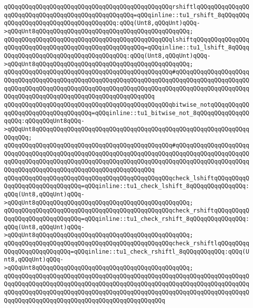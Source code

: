 \verb|qQQqqQQqqQQqqQQqqQQqqQQqqQQqqQQqqQQqqQQqqQQqqQQqrshiftlqQQqqQQqqQQqqQQqqQQqqQQqqQQqqQQqqQQqqQQqqQQqqQQqqQQq=qQQqinline::tu1_rshift_8qQQqqQQqqQQqqQQqqQQqqQQqqQQqqQQqqQQqqQQq:qQQq(Unt8,qQQqUnt)qQQq->qQQqUnt8qQQqqQQqqQQqqQQqqQQqqQQqqQQqqQQqqQQqqQQqqQQq;|\newline
\verb|qQQqqQQqqQQqqQQqqQQqqQQqqQQqqQQqqQQqqQQqqQQqqQQqlshiftqQQqqQQqqQQqqQQqqQQqqQQqqQQqqQQqqQQqqQQqqQQqqQQqqQQqqQQq=qQQqinline::tu1_lshift_8qQQqqQQqqQQqqQQqqQQqqQQqqQQqqQQqqQQqqQQq:qQQq(Unt8,qQQqUnt)qQQq->qQQqUnt8qQQqqQQqqQQqqQQqqQQqqQQqqQQqqQQqqQQqqQQqqQQq;|\newline
\verb|qQQqqQQqqQQqqQQqqQQqqQQqqQQqqQQqqQQqqQQqqQQqqQQq#qQQqqQQqqQQqqQQqqQQqqQQqqQQqqQQqqQQqqQQqqQQqqQQqqQQqqQQqqQQqqQQqqQQqqQQqqQQqqQQqqQQqqQQqqQQqqQQqqQQqqQQqqQQqqQQqqQQqqQQqqQQqqQQqqQQqqQQqqQQqqQQqqQQqqQQqqQQqqQQqqQQqqQQqqQQqqQQqqQQqqQQqqQQqqQQqqQQqqQQqqQQq|\newline
\verb|qQQqqQQqqQQqqQQqqQQqqQQqqQQqqQQqqQQqqQQqqQQqqQQqbitwise_notqQQqqQQqqQQqqQQqqQQqqQQqqQQqqQQqqQQq=qQQqinline::tu1_bitwise_not_8qQQqqQQqqQQqqQQqqQQq:qQQqqQQqUnt8qQQq->qQQqUnt8qQQqqQQqqQQqqQQqqQQqqQQqqQQqqQQqqQQqqQQqqQQqqQQqqQQqqQQqqQQqqQQqqQQq;|\newline
\verb|qQQqqQQqqQQqqQQqqQQqqQQqqQQqqQQqqQQqqQQqqQQqqQQq#qQQqqQQqqQQqqQQqqQQqqQQqqQQqqQQqqQQqqQQqqQQqqQQqqQQqqQQqqQQqqQQqqQQqqQQqqQQqqQQqqQQqqQQqqQQqqQQqqQQqqQQqqQQqqQQqqQQqqQQqqQQqqQQqqQQqqQQqqQQqqQQqqQQqqQQqqQQqqQQqqQQqqQQqqQQqqQQqqQQqqQQqqQQqqQQqqQQqqQQqqQQq|\newline
\verb|qQQqqQQqqQQqqQQqqQQqqQQqqQQqqQQqqQQqqQQqqQQqqQQqcheck_lshiftqQQqqQQqqQQqqQQqqQQqqQQqqQQqqQQq=qQQqinline::tu1_check_lshift_8qQQqqQQqqQQqqQQq:qQQq(Unt8,qQQqUnt)qQQq->qQQqUnt8qQQqqQQqqQQqqQQqqQQqqQQqqQQqqQQqqQQqqQQqqQQq;|\newline
\verb|qQQqqQQqqQQqqQQqqQQqqQQqqQQqqQQqqQQqqQQqqQQqqQQqcheck_rshiftqQQqqQQqqQQqqQQqqQQqqQQqqQQqqQQq=qQQqinline::tu1_check_rshift_8qQQqqQQqqQQqqQQq:qQQq(Unt8,qQQqUnt)qQQq->qQQqUnt8qQQqqQQqqQQqqQQqqQQqqQQqqQQqqQQqqQQqqQQqqQQq;|\newline
\verb|qQQqqQQqqQQqqQQqqQQqqQQqqQQqqQQqqQQqqQQqqQQqqQQqcheck_rshiftlqQQqqQQqqQQqqQQqqQQqqQQqqQQq=qQQqinline::tu1_check_rshiftl_8qQQqqQQqqQQq:qQQq(Unt8,qQQqUnt)qQQq->qQQqUnt8qQQqqQQqqQQqqQQqqQQqqQQqqQQqqQQqqQQqqQQqqQQq;|\newline
\verb|qQQqqQQqqQQqqQQqqQQqqQQqqQQqqQQqqQQqqQQqqQQqqQQqqQQqqQQqqQQqqQQqqQQqqQQqqQQqqQQqqQQqqQQqqQQqqQQqqQQqqQQqqQQqqQQqqQQqqQQqqQQqqQQqqQQqqQQqqQQqqQQqqQQqqQQqqQQqqQQqqQQqqQQqqQQqqQQqqQQqqQQqqQQqqQQqqQQqqQQqqQQqqQQqqQQqqQQqqQQqqQQqqQQqqQQqqQQqqQQqqQQqqQQqqQQqqQQq|\newline
